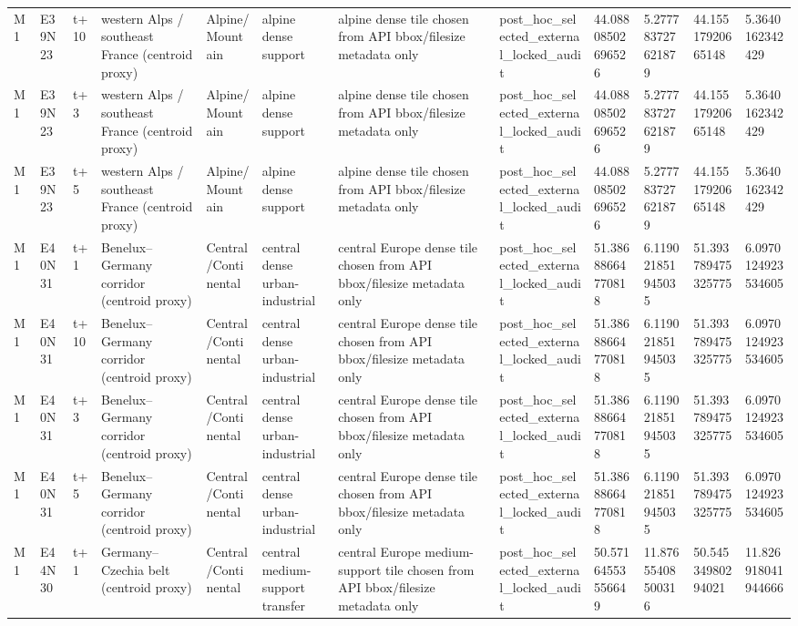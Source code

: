 \begin{landscape}
\begin{longtable}{llllllllllll}
M1 & E39N23 & t+10 & western Alps / southeast France (centroid proxy) & Alpine/Mountain & alpine dense support & alpine dense tile chosen from API bbox/filesize metadata only & post\_hoc\_selected\_external\_locked\_audit & 44.08808502696526 & 5.277783727621879 & 44.15517920665148 & 5.3640162342429 \\
M1 & E39N23 & t+3 & western Alps / southeast France (centroid proxy) & Alpine/Mountain & alpine dense support & alpine dense tile chosen from API bbox/filesize metadata only & post\_hoc\_selected\_external\_locked\_audit & 44.08808502696526 & 5.277783727621879 & 44.15517920665148 & 5.3640162342429 \\
M1 & E39N23 & t+5 & western Alps / southeast France (centroid proxy) & Alpine/Mountain & alpine dense support & alpine dense tile chosen from API bbox/filesize metadata only & post\_hoc\_selected\_external\_locked\_audit & 44.08808502696526 & 5.277783727621879 & 44.15517920665148 & 5.3640162342429 \\
M1 & E40N31 & t+1 & Benelux–Germany corridor (centroid proxy) & Central/Continental & central dense urban-industrial & central Europe dense tile chosen from API bbox/filesize metadata only & post\_hoc\_selected\_external\_locked\_audit & 51.38688664770818 & 6.119021851945035 & 51.393789475325775 & 6.0970124923534605 \\
M1 & E40N31 & t+10 & Benelux–Germany corridor (centroid proxy) & Central/Continental & central dense urban-industrial & central Europe dense tile chosen from API bbox/filesize metadata only & post\_hoc\_selected\_external\_locked\_audit & 51.38688664770818 & 6.119021851945035 & 51.393789475325775 & 6.0970124923534605 \\
M1 & E40N31 & t+3 & Benelux–Germany corridor (centroid proxy) & Central/Continental & central dense urban-industrial & central Europe dense tile chosen from API bbox/filesize metadata only & post\_hoc\_selected\_external\_locked\_audit & 51.38688664770818 & 6.119021851945035 & 51.393789475325775 & 6.0970124923534605 \\
M1 & E40N31 & t+5 & Benelux–Germany corridor (centroid proxy) & Central/Continental & central dense urban-industrial & central Europe dense tile chosen from API bbox/filesize metadata only & post\_hoc\_selected\_external\_locked\_audit & 51.38688664770818 & 6.119021851945035 & 51.393789475325775 & 6.0970124923534605 \\
M1 & E44N30 & t+1 & Germany–Czechia belt (centroid proxy) & Central/Continental & central medium-support transfer & central Europe medium-support tile chosen from API bbox/filesize metadata only & post\_hoc\_selected\_external\_locked\_audit & 50.57164553556649 & 11.87655408500316 & 50.54534980294021 & 11.826918041944666 \\

\end{longtable}
\end{landscape}
